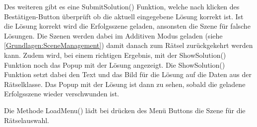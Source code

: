 Des weiteren gibt es eine SubmitSolution() Funktion, welche nach klicken des Bestätigen-Button überprüft ob die aktuell eingegebene Lösung korrekt ist. Ist die Lösung korrekt wird die Erfolgsszene geladen, ansonsten die Szene für falsche Lösungen. Die Szenen werden dabei im Additiven Modus geladen (siehe \ref{Grundlagen:SceneManagement}) damit danach zum Rätsel zurückgekehrt werden kann. Zudem wird, bei einem richtigen Ergebnis, mit der ShowSolution() Funktion noch das Popup mit der Lösung angezeigt. Die ShowSolution() Funktion setzt dabei den Text und das Bild für die Lösung auf die Daten aus der Rätselklasse. Das Popup mit der Lösung ist dann zu sehen, sobald die geladene Erfolgsszene wieder verschwunden ist.

Die Methode LoadMenu() lädt bei drücken des Menü Buttons die Szene für die Rätselauswahl.

